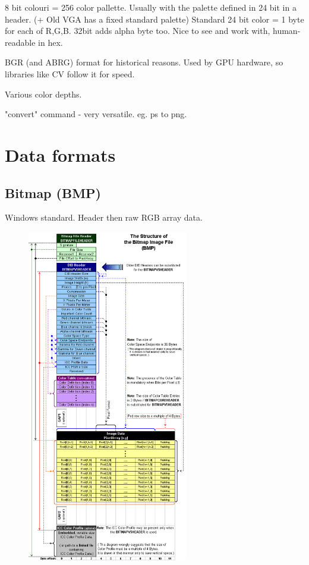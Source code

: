 \documentclass[oneside,english]{scrbook}
\begin{document}
8 bit colouri = 256 color pallette. Usually with the palette defined in 24 bit in a header. (+ Old VGA has a fixed standard palette)
Standard 24 bit color = 1 byte for each of R,G,B. 32bit adds alpha byte too.  Nice to see and work with, human-readable in hex.

BGR (and ABRG) format for historical reasons. Used by GPU hardware, so libraries like CV follow it for speed.

Various color depths.

"convert" command - very versatile. eg. ps to png.


\section{Data formats}



\subsection{Bitmap (BMP)}

Windows standard. Header then raw RGB array data.

\begin{figure}
	\caption{}
	\includegraphics[width=7cm]{figs/BMPfileFormat}
\end{figure}
\end{document}
